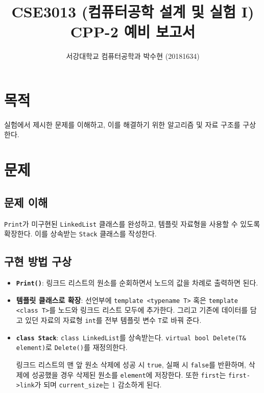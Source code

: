 
	


\title{CSE3013 (컴퓨터공학 설계 및 실험 I) \space \newline CPP-2 예비 보고서}
\author{서강대학교 컴퓨터공학과 박수현 (20181634)}
\maketitle

\section{목적}
실험에서 제시한 문제를 이해하고, 이를 해결하기 위한 알고리즘 및 자료 구조를 구상한다.

\section{문제}

\subsection{문제 이해}
\texttt{Print}가 미구현된 \texttt{LinkedList} 클래스를 완성하고, 템플릿 자료형을 사용할 수 있도록 확장한다. 이를 상속받는 \texttt{Stack} 클래스를 작성한다.

\subsection{구현 방법 구상}

\begin{itemize}
	\item \textbf{\texttt{Print()}}: 링크드 리스트의 원소를 순회하면서 노드의 값을 차례로 출력하면 된다.
	\item \textbf{템플릿 클래스로 확장}: 선언부에 \texttt{template <typename T>} 혹은 \texttt{template <class T>}를 노드와 링크드 리스트 모두에 추가한다. 그리고 기존에 데이터를 담고 있던 자료의 자료형 \texttt{int}를 전부 템플릿 변수 \texttt{T}로 바꿔 준다.
	\item \textbf{\texttt{class Stack}}: \texttt{class LinkedList}를 상속받는다. \texttt{virtual bool Delete(T& element)}로 \texttt{Delete()}를 재정의한다.
	
	링크드 리스트의 맨 앞 원소 삭제에 성공 시 \texttt{true}, 실패 시 \texttt{false}를 반환하며, 삭제에 성공했을 경우 삭제된 원소를 \texttt{element}에 저장한다. 또한 \texttt{first}는 \texttt{first->link}가 되며 \texttt{current_size}는 1 감소하게 된다.
\end{itemize}

